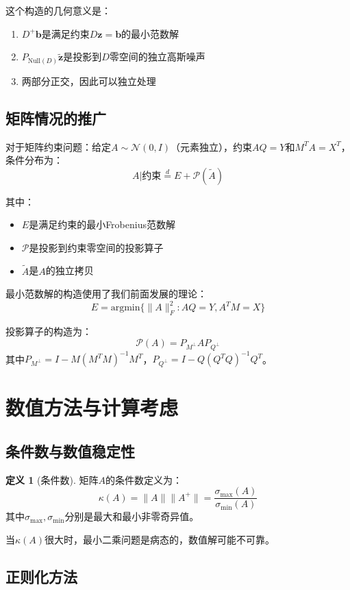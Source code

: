 \documentclass[11pt,a4paper]{ctexart}
\theoremstyle{definition}
\newtheorem{definition}{定义}[section]
\newcommand{\argmin}{\text{argmin}}
\newcommand{\Null}{\text{Null}}
\begin{document}
这个构造的几何意义是：
\begin{enumerate}
\item $D^+\boldsymbol{b}$是满足约束$D\boldsymbol{z} = \boldsymbol{b}$的最小范数解
\item $P_{\Null(D)} \tilde{\boldsymbol{z}}$是投影到$D$零空间的独立高斯噪声
\item 两部分正交，因此可以独立处理
\end{enumerate}

\subsection{矩阵情况的推广}

对于矩阵约束问题：给定$A \sim \mathcal{N}(0, I)$（元素独立），约束$AQ = Y$和$M^TA = X^T$，条件分布为：
$$A | \text{约束} \stackrel{d}{=} E + \mathcal{P}(\tilde{A})$$

其中：
\begin{itemize}
\item $E$是满足约束的最小Frobenius范数解
\item $\mathcal{P}$是投影到约束零空间的投影算子
\item $\tilde{A}$是$A$的独立拷贝
\end{itemize}

最小范数解的构造使用了我们前面发展的理论：
$$E = \argmin\{\|A\|_F^2 : AQ = Y, A^TM = X\}$$

投影算子的构造为：
$$\mathcal{P}(A) = P_{M^\perp} A P_{Q^\perp}$$
其中$P_{M^\perp} = I - M(M^TM)^{-1}M^T$，$P_{Q^\perp} = I - Q(Q^TQ)^{-1}Q^T$。

\section{数值方法与计算考虑}

\subsection{条件数与数值稳定性}

\begin{definition}[条件数]
矩阵$A$的条件数定义为：
$$\kappa(A) = \|A\| \|A^+\| = \frac{\sigma_{\max}(A)}{\sigma_{\min}(A)}$$
其中$\sigma_{\max}, \sigma_{\min}$分别是最大和最小非零奇异值。
\end{definition}

当$\kappa(A)$很大时，最小二乘问题是病态的，数值解可能不可靠。

\subsection{正则化方法}
\end{document}
